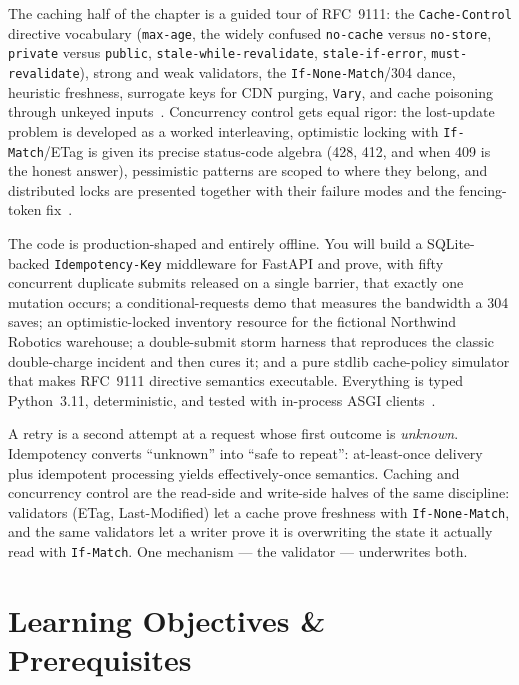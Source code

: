 The caching half of the chapter is a guided tour of RFC~9111: the
\texttt{Cache-Control} directive vocabulary (\texttt{max-age}, the widely
confused \texttt{no-cache} versus \texttt{no-store}, \texttt{private} versus
\texttt{public}, \texttt{stale-while-revalidate}, \texttt{stale-if-error},
\texttt{must-revalidate}), strong and weak validators, the
\texttt{If-None-Match}/304 dance, heuristic freshness, surrogate keys for
CDN purging, \texttt{Vary}, and cache poisoning through unkeyed
inputs~\cite{rfc9110}. Concurrency control gets equal rigor: the lost-update
problem is developed as a worked interleaving, optimistic locking with
\texttt{If-Match}/ETag is given its precise status-code algebra (428, 412,
and when 409 is the honest answer), pessimistic patterns are scoped to where
they belong, and distributed locks are presented together with their failure
modes and the fencing-token fix~\cite{kleppmann2017ddia,nygard2018releaseit}.

The code is production-shaped and entirely offline. You will build a
SQLite-backed \texttt{Idempotency-Key} middleware for FastAPI and prove,
with fifty concurrent duplicate submits released on a single barrier, that
exactly one mutation occurs; a conditional-requests demo that measures the
bandwidth a 304 saves; an optimistic-locked inventory resource for the
fictional Northwind Robotics warehouse; a double-submit storm harness that
reproduces the classic double-charge incident and then cures it; and a pure
stdlib cache-policy simulator that makes RFC~9111 directive semantics
executable. Everything is typed Python~3.11, deterministic, and tested with
in-process ASGI clients~\cite{fastapidocs,pydanticdocs}.

\begin{keyconceptbox}
A retry is a second attempt at a request whose first outcome is
\emph{unknown}. Idempotency converts ``unknown'' into ``safe to repeat'':
at-least-once delivery plus idempotent processing yields effectively-once
semantics. Caching and concurrency control are the read-side and write-side
halves of the same discipline: validators (ETag, Last-Modified) let a cache
prove freshness with \texttt{If-None-Match}, and the same validators let a
writer prove it is overwriting the state it actually read with
\texttt{If-Match}. One mechanism --- the validator --- underwrites both.
\end{keyconceptbox}

\section{Learning Objectives \& Prerequisites}
\label{sec:ch10-objectives}

